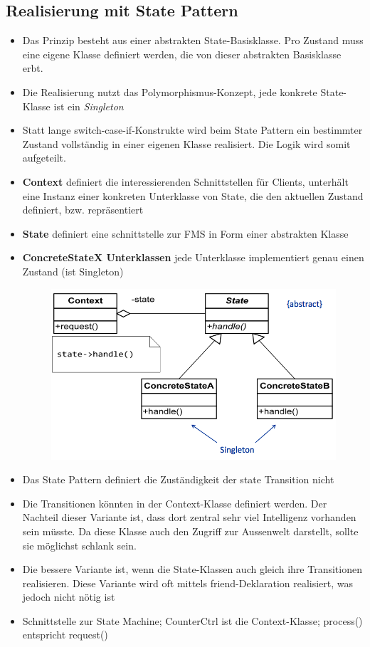 \subsection{Realisierung mit State Pattern}
\begin{itemize}
  \item Das Prinzip besteht aus einer abstrakten State-Basisklasse. Pro Zustand
        muss eine eigene Klasse definiert werden, die von dieser abstrakten
        Basisklasse erbt.
  \item Die Realisierung nutzt das Polymorphismus-Konzept, jede konkrete
        State-Klasse ist ein \textit{Singleton}
  \item Statt lange switch-case-if-Konstrukte wird beim State Pattern ein
        bestimmter Zustand vollständig in einer eigenen Klasse realisiert. Die Logik
        wird somit aufgeteilt.
  \item \textbf{Context} definiert die interessierenden Schnittstellen für
        Clients, unterhält eine Instanz einer konkreten Unterklasse von State, die den
        aktuellen Zustand definiert, bzw. repräsentiert
  \item \textbf{State} definiert eine schnittstelle zur FMS in Form einer
        abstrakten Klasse
  \item \textbf{ConcreteStateX Unterklassen} jede Unterklasse implementiert
        genau einen Zustand (ist Singleton)
        \begin{figure}[h]
          \centering
          \includegraphics[scale = 0.3]{images/FSM/state_pattern}
        \end{figure}
  \item Das State Pattern definiert die Zuständigkeit der state Transition nicht
  \item Die Transitionen könnten in der Context-Klasse definiert werden. Der
        Nachteil dieser Variante ist, dass dort zentral sehr viel Intelligenz vorhanden
        sein müsste. Da diese Klasse auch den Zugriff zur Aussenwelt darstellt, sollte
        sie möglichst schlank sein.
  \item Die bessere Variante ist, wenn die State-Klassen auch gleich ihre
        Transitionen realisieren. Diese Variante wird oft mittels friend-Deklaration
        realisiert, was jedoch nicht nötig ist
  \item Schnittstelle zur State Machine; CounterCtrl ist die Context-Klasse; process() entspricht request()
\end{itemize}

